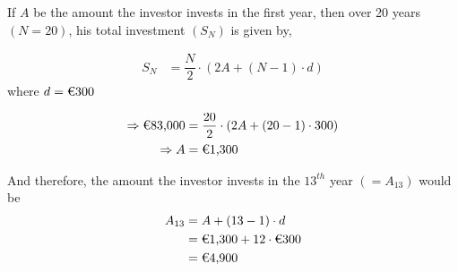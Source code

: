 \begin{solution}[\halfpage]
  If $A$ be the amount the investor invests in the first year, then over 20 years $(N=20)$, his
  total investment $(S_N)$ is given by, 

  \begin{align}
    S_N &= \dfrac{N}{2}\cdot(2A + (N-1)\cdot d)
  \end{align}
  where $d=\text{\texteuro 300}$

  \begin{align}
    \Rightarrow \text{\texteuro 83,000} &= \dfrac{20}{2}\cdot(2A + (20-1)\cdot 300) \\
    \Rightarrow A &= \text{\texteuro 1,300}
  \end{align}

  And therefore, the amount the investor invests in the $13^{th}$ year $(=A_{13})$ would be
  \begin{align}
    A_{13} &= A + (13-1)\cdot d \\
           &= \text{\texteuro 1,300} + 12\cdot \text{\texteuro 300} \\
           &= \text{\texteuro 4,900}
  \end{align}
\end{solution}
